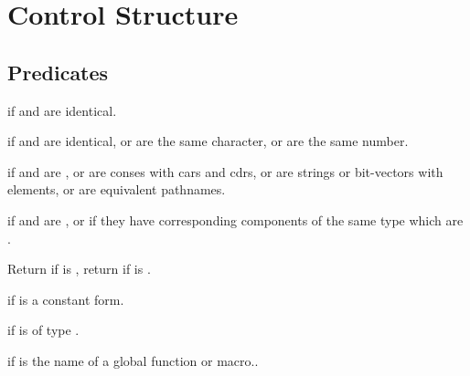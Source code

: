 %
%

\section{Control Structure}

\subsection{Predicates}
\begin{LIST}{1cm}

  {
  \retval{\T} if  and  are identical.
  }

  {
  \retval{\T} if  and 
  are identical, or are the same character, or are the same number.
  }

  {
  \retval{\T} if  and 
  are , or are conses with  cars and cdrs, or are
  strings or bit-vectors with   elements, or are equivalent pathnames.
  }

  {
  \retval{\T} if  and 
  are , or if they have corresponding components of the same
  type which are .
  }

  {
  Return \retval{\NIL} if  is \T, return \retval{\T} if  is \NIL.
  }

  {
  \retval{\T} if  is a constant form.
  }

  {
  \retval{\T} if  is of type .
  }

  {
  \retval{\T} if  is the name of a global function or macro..
  }


\end{LIST}


